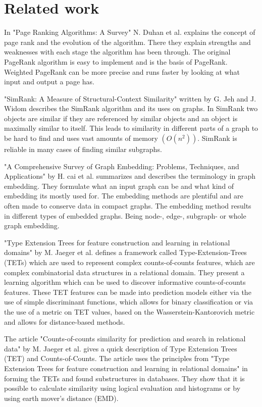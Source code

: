 \section{Related work}
\label{Related_work}
In "Page Ranking Algorithms: A Survey" N. Duhan et al.\cite{4809246} explains the concept of page rank and the evolution of the algorithm. There they explain strengths and weaknesses with each stage the algorithm has been through. The original PageRank algorithm is easy to implement and is the basis of PageRank. Weighted PageRank can be more precise and runs faster by looking at what input and output a page has.

"SimRank: A Measure of Structural-Context Similarity" written by G. Jeh and J. Widom\cite{10.1145/775047.775126} describes the SimRank algorithm and its uses on graphs. In SimRank two objects are similar if they are referenced by similar objects and an object is maximally similar to itself. This leads to similarity in different parts of a graph to be hard to find and uses vast amounts of memory $(O(n^2))$. SimRank is reliable in many cases of finding similar subgraphs.

"A Comprehensive Survey of Graph Embedding: Problems, Techniques, and Applications" by H. cai et al.\cite{8294302} summarizes and describes the terminology in graph embedding. They formulate what an input graph can be and what kind of embedding its mostly used for. The embedding methods are plentiful and are often made to conserve data in compact graphs. The embedding method results in different types of embedded graphs. Being node-, edge-, subgraph- or whole graph embedding.

"Type Extension Trees for feature construction and learning in relational domains" by M. Jaeger et al. \cite{JAEGER201330} defines a framework called Type-Extension-Trees (TETs) which are used to represent complex counts-of-counts features, which are complex combinatorial data structures in a relational domain. They present a learning algorithm which can be used to discover informative counts-of-counts features. These TET features can be made into prediction models either via the use of simple discriminant functions, which allows for binary classification or via the use of a metric on TET values, based on the Wasserstein-Kantorovich metric and allows for distance-based methods.

The article "Counts-of-counts similarity for prediction and search in relational data" by M. Jaeger et al.\cite{jaeger2019counts} gives a quick description of Type Extension Trees (TET) and Counts-of-Counts. The article uses the principles from "Type Extension Trees for feature construction and learning in relational domains" in forming the TETs and found substructures in databases. They show that it is possible to calculate similarity using logical evaluation and histograms or by using earth mover's distance (EMD).

